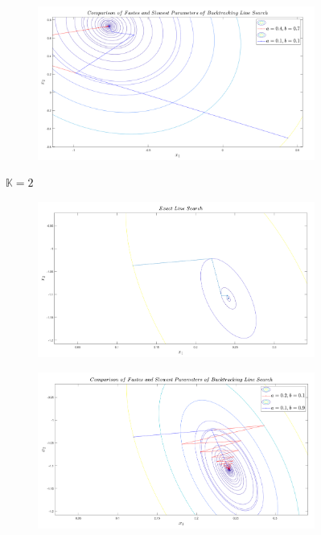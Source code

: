 \documentclass[12pt]{article}
\begin{document}
\begin{enumerate}
\begin{enumerate}
\begin{figure}
\begin{subfigure}[b]{0.45\textwidth}
				\end{subfigure}
				\hfill
				\begin{subfigure}[b]{0.45\textwidth}
					\centering
					\includegraphics[width=\textwidth]{2_2.png}
				\end{subfigure}
				\caption{$\mathbb{K}=2$}
			\end{figure}
			\begin{figure}
				\centering
				\begin{subfigure}[b]{0.45\textwidth}
					\centering
					\includegraphics[width=\textwidth]{3_3.png}
				\end{subfigure}
				\hfill
				\begin{subfigure}[b]{0.45\textwidth}
					\centering
					\includegraphics[width=\textwidth]{3_2.png}

\end{subfigure}
\end{figure}
\end{enumerate}
\end{enumerate}
\end{document}
